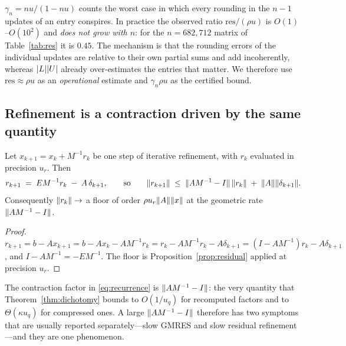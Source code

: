 \begin{remark}\label{rem:gamma}
$\gamma_n=nu/(1-nu)$ counts the worst case in which every rounding in the
$n-1$ updates of an entry conspires. In practice the observed ratio
$\mathrm{res}/(\rho u)$ is $O(1)$--$O(10^2)$ and \emph{does not grow with $n$}:
for the $n=682{,}712$ matrix of Table~\ref{tab:res} it is $0.45$. The mechanism
is that the rounding errors of the individual updates are relative to their own
partial sums and add incoherently, whereas $\lvert L \rvert\lvert U \rvert$ already
over-estimates the entries that matter. We therefore use $\mathrm{res}\approx\rho u$
as an \emph{operational} estimate and $\gamma_n\rho u$ as the certified bound.
\end{remark}

\subsection{Refinement is a contraction driven by the same quantity}

\begin{proposition}\label{prop:recurrence}
Let $x_{k+1}=x_k+M^{-1}r_k$ be one step of iterative refinement, with $r_k$
evaluated in precision $u_r$. Then
\begin{equation}\label{eq:recurrence}
  r_{k+1} \;=\; E M^{-1} r_k \;-\; A\,\delta_{k+1},
  \qquad\text{so}\qquad
  \lVert r_{k+1} \rVert \;\le\; \lVert AM^{-1}-I \rVert\,\lVert r_k \rVert \;+\; \lVert A \rVert\lVert \delta_{k+1} \rVert .
\end{equation}
Consequently $\lVert r_k \rVert\to$ a floor of order $\rho u_r\lVert A \rVert\lVert x \rVert$ at the
geometric rate $\lVert AM^{-1}-I \rVert$.
\end{proposition}

\begin{proof}
$r_{k+1}=b-Ax_{k+1}=b-Ax_k-AM^{-1}r_k=r_k-AM^{-1}r_k-A\delta_{k+1}
=(I-AM^{-1})r_k-A\delta_{k+1}$, and $I-AM^{-1}=-EM^{-1}$.
The floor is Proposition~\ref{prop:residual} applied at precision $u_r$.
\end{proof}

\begin{remark}
The contraction factor in \eqref{eq:recurrence} is $\lVert AM^{-1}-I \rVert$: the very
quantity that Theorem~\ref{thm:dichotomy} bounds to $O(1/u_q)$ for recomputed
factors and to $\Theta(\kappa u_q)$ for compressed ones. A large
$\lVert AM^{-1}-I \rVert$ therefore has two symptoms that are usually reported
separately---slow GMRES and slow residual refinement---and they are one
phenomenon.
\end{remark}

